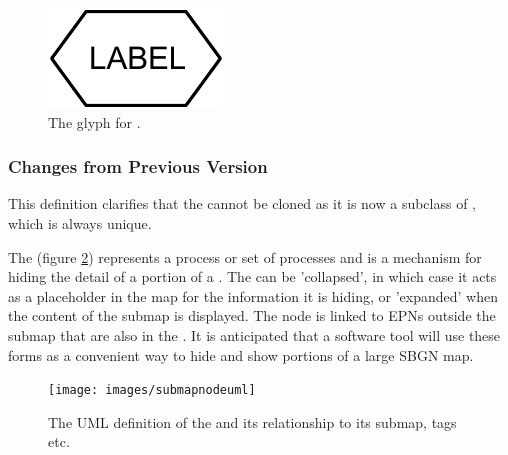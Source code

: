 \begin{figure}[htb]
  \centering
  \includegraphics[scale = 0.3]{images/phenotype}
  \caption{The \PD glyph for .}
  \label{fig:techref:phenotype}
\end{figure}


\subsubsection{Changes from Previous Version}

This definition clarifies that the  cannot be
cloned as it is now a subclass of , which is always
unique.


\label{sec:techref:submap}\label{defn:Submap}

The  (figure \ref{fig:techref:submapnodeuml})
represents a process or set of processes and is a mechanism for hiding
the detail of a portion of a \PDm. The  can be
'collapsed', in which case it acts as a placeholder in the map for the
information it is hiding, or 'expanded' when the content of the submap
is displayed. The node is linked to EPNs outside the submap that are
also in the .  It is anticipated that a software tool
will use these forms as a convenient way to hide and show portions of
a large SBGN map.


\begin{figure}[htb]
  \centering
  \texttt{[image: images/submapnodeuml]}
  \caption{The UML definition of the  and its
   relationship to its submap, tags etc.}
  \label{fig:techref:submapnodeuml}
\end{figure}

